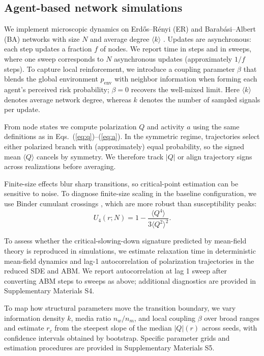 \documentclass[preprint,12pt]{elsarticle}
\begin{document}
\subsection{Agent-based network simulations}
We implement microscopic dynamics on Erd\H{o}s--R\'enyi (ER) and Barab\'asi--Albert (BA) networks with size $N$ and average degree $\langle k\rangle$ \cite{Erdos1959,Barabasi1999,PastorSatorras2015}. Updates are asynchronous: each step updates a fraction $f$ of nodes. We report time in steps and in sweeps, where one sweep corresponds to $N$ asynchronous updates (approximately $1/f$ steps). To capture local reinforcement, we introduce a coupling parameter $\beta$ that blends the global environment $p_{\text{env}}$ with neighbor information when forming each agent's perceived risk probability; $\beta=0$ recovers the well-mixed limit. Here $\langle k\rangle$ denotes average network degree, whereas $k$ denotes the number of sampled signals per update.

From node states we compute polarization $Q$ and activity $a$ using the same definitions as in Eqs.~(\ref{eq:q})--(\ref{eq:a}). In the symmetric regime, trajectories select either polarized branch with (approximately) equal probability, so the signed mean $\langle Q\rangle$ cancels by symmetry. We therefore track $|Q|$ or align trajectory signs across realizations before averaging.

Finite-size effects blur sharp transitions, so critical-point estimation can be sensitive to noise. To diagnose finite-size scaling in the baseline configuration, we use Binder cumulant crossings \cite{Binder1981,NewmanBarkema1999}, which are more robust than susceptibility peaks:
\begin{equation}
U_4(r;N)=1-\frac{\langle Q^4\rangle}{3\langle Q^2\rangle^2}.
\label{eq:binder}
\end{equation}

To assess whether the critical-slowing-down signature predicted by mean-field theory is reproduced in simulations, we estimate relaxation time in deterministic mean-field dynamics and lag-1 autocorrelation of polarization trajectories in the reduced SDE and ABM. We report autocorrelation at lag 1 sweep after converting ABM steps to sweeps as above; additional diagnostics are provided in Supplementary Materials S4.

To map how structural parameters move the transition boundary, we vary information density $k$, media ratio $n_w/n_m$, and local coupling $\beta$ over broad ranges and estimate $r_c$ from the steepest slope of the median $|Q|(r)$ across seeds, with confidence intervals obtained by bootstrap. Specific parameter grids and estimation procedures are provided in Supplementary Materials S5.
\end{document}
